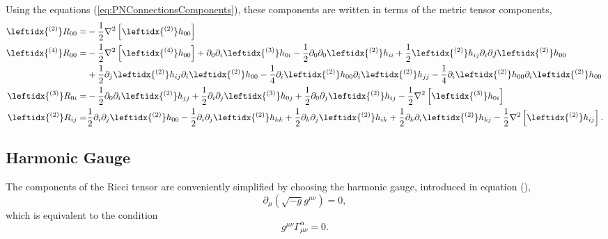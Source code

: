 Using the equations (\ref{eq:PNConnectionsComponents}), these components are written in terms of the metric tensor components,
\begin{subequations}\label{eq:1PNRicciTensorComponents}
\begin{align}
\leftidx{ ^{(2)}}R_{00} = &- \frac{1}{2} \nabla^2 \left[ \leftidx{ ^{(2)}} h_{00} \right] \\
\leftidx{ ^{(4)}}R_{00} = &- \frac{1}{2} \nabla^2 \left[ \leftidx{ ^{(4)}} h_{00} \right]+  \partial_0 \partial _i \leftidx{ ^{(3)}} h_{0i}  - \frac{1}{2} \partial_0 \partial_0 \leftidx{ ^{(2)}} h_{ii}  + \frac{1}{2} \leftidx{ ^{(2)}} h_{ij} \partial_i \partial j \leftidx{ ^{(2)}} h_{00} \notag \\ 
&+ \frac{1}{2}  \partial _j \leftidx{ ^{(2)}} h_{ij} \partial _i  \leftidx{ ^{(2)}} h_{00} - \frac{1}{4} \partial _i \leftidx{ ^{(2)}} h_{00}  \partial _i \leftidx{ ^{(2)}} h_{jj} -\frac{1}{4} \partial _i \leftidx{ ^{(2)}} h_{00}  \partial _i \leftidx{ ^{(2)}} h_{00} \\
\leftidx{ ^{(3)}}R_{0i} = & -\frac{1}{2} \partial_0 \partial_i \leftidx{ ^{(2)}} h_{jj} + \frac{1}{2} \partial_i \partial_j \leftidx{ ^{(3)}} h_{0j} + \frac{1}{2} \partial_0 \partial_j \leftidx{ ^{(2)}} h_{ij} - \frac{1}{2} \nabla^2 \left[ \leftidx{ ^{(3)}} h_{0i}\right]\\
\leftidx{ ^{(2)}}R_{ij} = & \frac{1}{2} \partial_i \partial_j \leftidx{ ^{(2)}} h_{00} - \frac{1}{2} \partial_i \partial_j \leftidx{ ^{(2)}} h_{kk} + \frac{1}{2} \partial_k \partial_j \leftidx{ ^{(2)}} h_{ik} + \frac{1}{2} \partial_k \partial_i \leftidx{ ^{(2)}} h_{kj} - \frac{1}{2} \nabla^2  \left[\leftidx{ ^{(2)}} h_{ij} \right].
\end{align}
\end{subequations}

\subsection{Harmonic Gauge}
The components of the Ricci tensor are conveniently simplified by choosing the harmonic gauge, introduced in equation (),
\begin{equation}
\partial_\mu \left( \sqrt{-g} g^{\mu \nu} \right) = 0,
\end{equation}
which is equivalent to the condition
\begin{equation}
g^{\mu \nu} \Gamma^\alpha_{\mu \nu} = 0. \label{eq:HarmonicGauge02}
\end{equation}

